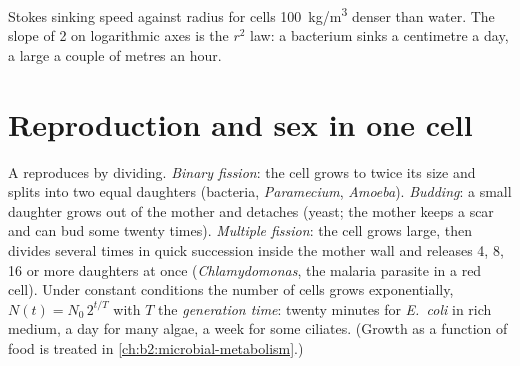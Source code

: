 \begin{omfigure}

{\small Stokes sinking speed against radius for cells
\qty{100}{kg/m^3} denser than water. The slope of 2 on logarithmic
axes is the $r^2$ law: a bacterium sinks a centimetre a day, a large
 a couple of metres an hour.}
\end{omfigure}

\section{Reproduction and sex in one cell}

\begin{definition}\label{def:b2:unicellular-diversity:division}
A  reproduces by dividing. \emph{Binary
fission}: the cell grows to twice its size and splits into two
equal daughters (bacteria, \emph{Paramecium}, \emph{Amoeba}).
\emph{Budding}: a small daughter grows out of the mother and detaches
(yeast; the mother keeps a scar and can bud some twenty times).
\emph{Multiple fission}: the cell grows large, then divides several
times in quick succession inside the mother wall and releases 4, 8,
16 or more daughters at once (\emph{Chlamydomonas}, the malaria
parasite in a red cell). Under constant conditions the number of
cells grows exponentially, $N(t) = N_0\,2^{t/T}$ with $T$ the
\emph{generation time}: twenty minutes for
\emph{E.~coli} in rich medium, a day for many algae, a week for some
ciliates. (Growth as a function of food is treated in
\cref{ch:b2:microbial-metabolism}.)
\end{definition}

